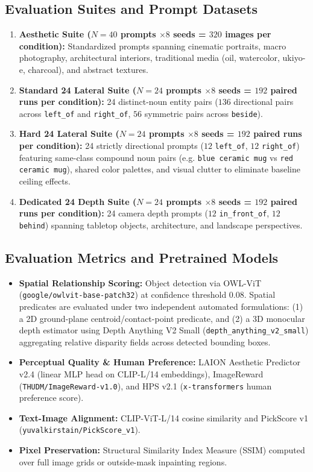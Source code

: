 \documentclass[10pt,twocolumn,letterpaper]{article}
\begin{document}
\subsection{Evaluation Suites and Prompt Datasets}
\begin{enumerate}
    \item \textbf{Aesthetic Suite ($N = 40$ prompts $\times 8$ seeds = $320$ images per condition):} Standardized prompts spanning cinematic portraits, macro photography, architectural interiors, traditional media (oil, watercolor, ukiyo-e, charcoal), and abstract textures.
    \item \textbf{Standard 24 Lateral Suite ($N = 24$ prompts $\times 8$ seeds = $192$ paired runs per condition):} 24 distinct-noun entity pairs ($136$ directional pairs across \texttt{left\_of} and \texttt{right\_of}, $56$ symmetric pairs across \texttt{beside}).
    \item \textbf{Hard 24 Lateral Suite ($N = 24$ prompts $\times 8$ seeds = $192$ paired runs per condition):} 24 strictly directional prompts ($12$ \texttt{left\_of}, $12$ \texttt{right\_of}) featuring same-class compound noun pairs (e.g. \texttt{blue ceramic mug} vs \texttt{red ceramic mug}), shared color palettes, and visual clutter to eliminate baseline ceiling effects.
    \item \textbf{Dedicated 24 Depth Suite ($N = 24$ prompts $\times 8$ seeds = $192$ paired runs per condition):} 24 camera depth prompts ($12$ \texttt{in\_front\_of}, $12$ \texttt{behind}) spanning tabletop objects, architecture, and landscape perspectives.
\end{enumerate}

\subsection{Evaluation Metrics and Pretrained Models}
\begin{itemize}
    \item \textbf{Spatial Relationship Scoring:} Object detection via OWL-ViT (\texttt{google/owlvit-base-patch32}) at confidence threshold $0.08$. Spatial predicates are evaluated under two independent automated formulations: (1) a 2D ground-plane centroid/contact-point predicate, and (2) a 3D monocular depth estimator using Depth Anything V2 Small (\texttt{depth\_anything\_v2\_small}) aggregating relative disparity fields across detected bounding boxes.
    \item \textbf{Perceptual Quality \& Human Preference:} LAION Aesthetic Predictor v2.4 (linear MLP head on CLIP-L/14 embeddings), ImageReward (\texttt{THUDM/ImageReward-v1.0}), and HPS v2.1 (\texttt{x-transformers} human preference score).
    \item \textbf{Text-Image Alignment:} CLIP-ViT-L/14 cosine similarity and PickScore v1 (\texttt{yuvalkirstain/PickScore\_v1}).
    \item \textbf{Pixel Preservation:} Structural Similarity Index Measure (SSIM) computed over full image grids or outside-mask inpainting regions.
\end{itemize}
\end{document}
